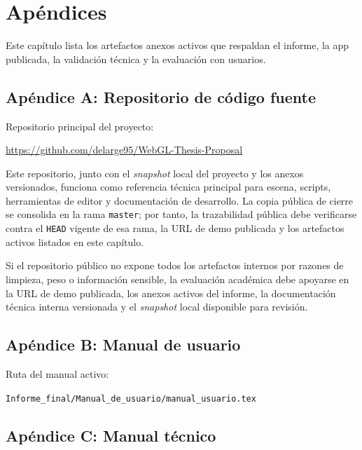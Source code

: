 \newpage
\section*{Apéndices}

Este capítulo lista los artefactos anexos activos que respaldan el informe, la app publicada, la validación técnica y la evaluación con usuarios.

\subsection*{Apéndice A: Repositorio de código fuente}

Repositorio principal del proyecto:
\begin{center}
\url{https://github.com/delarge95/WebGL-Thesis-Proposal}
\end{center}

\noindent Este repositorio, junto con el \textit{snapshot} local del proyecto y los anexos versionados, funciona como referencia técnica principal para escena, scripts, herramientas de editor y documentación de desarrollo. La copia pública de cierre se consolida en la rama \texttt{master}; por tanto, la trazabilidad pública debe verificarse contra el \texttt{HEAD} vigente de esa rama, la URL de demo publicada y los artefactos activos listados en este capítulo.

\noindent Si el repositorio público no expone todos los artefactos internos por razones de limpieza, peso o información sensible, la evaluación académica debe apoyarse en la URL de demo publicada, los anexos activos del informe, la documentación técnica interna versionada y el \textit{snapshot} local disponible para revisión.

\subsection*{Apéndice B: Manual de usuario}

Ruta del manual activo:
\begin{center}
\texttt{Informe\_final/Manual\_de\_usuario/manual\_usuario.tex}
\end{center}

\subsection*{Apéndice C: Manual técnico}

